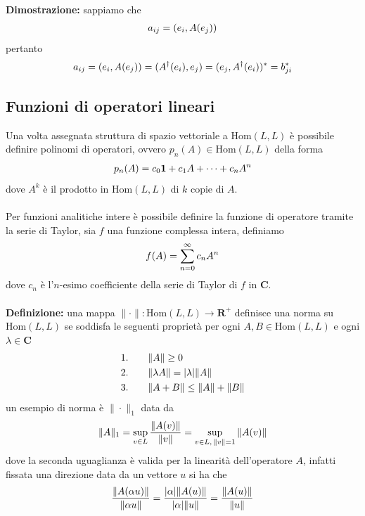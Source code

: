 \documentclass{article}
\begin{document}
\textbf{Dimostrazione:} sappiamo che
\begin{gather}
    a_{ij} = (e_i, A(e_j)) \notag
\end{gather}
pertanto
\begin{gather}
    a_{ij} = (e_i, A(e_j)) = (A^\dagger(e_i), e_j) = (e_j, A^\dagger(e_i))^* = b^*_{ji} \notag
\end{gather}

\newpage
\subsection{Funzioni di operatori lineari}
Una volta assegnata struttura di spazio vettoriale a $\mathrm{Hom}(L, L)$ è possibile definire polinomi di operatori, ovvero $p_n(A) \in \mathrm{Hom}(L, L)$ della forma
\begin{gather}
    p_n(A) = c_0\mathbf{1} + c_1A + \dots + c_nA^n \notag
\end{gather}
dove $A^k$ è il prodotto in $\mathrm{Hom}(L, L)$ di $k$ copie di $A$. \\ \\
Per funzioni analitiche intere è possibile definire la funzione di operatore tramite la serie di Taylor, sia $f$ una funzione complessa intera, definiamo
\begin{gather}
    f(A) = \sum_{n = 0}^\infty c_nA^n \notag
\end{gather}
dove $c_n$ è l'$n$-esimo coefficiente della serie di Taylor di $f$ in $\mathbf{C}$. \\ \\
\textbf{Definizione:} una mappa $\|\cdot\| : \mathrm{Hom}(L, L) \longrightarrow \mathbf{R}^+$ definisce una norma su $\mathrm{Hom}(L, L)$ se soddisfa le seguenti proprietà per ogni $A, B \in \mathrm{Hom}(L, L)$ e ogni $\lambda \in \mathbf{C}$
\begin{align}
    1. \qquad &\|A\| \geq 0 \notag \\
    2. \qquad &\|\lambda A\| = |\lambda|\|A\| \notag \\
    3. \qquad &\|A + B\| \leq \|A\| + \|B\| \notag
\end{align}
un esempio di norma è $\|\cdot\|_1$ data da
\begin{gather}
    \|A\|_1 = \sup_{v \in L}\frac{\|A(v)\|}{\|v\|} = \sup_{v \in L, \, \|v\| = 1}\|A(v)\| \notag
\end{gather}
dove la seconda uguaglianza è valida per la linearità dell'operatore $A$, infatti fissata una direzione data da un vettore $u$ si ha che
\begin{gather}
    \frac{\|A(\alpha u)\|}{\|\alpha u\|} = \frac{|\alpha|\|A(u)\|}{|\alpha|\|u\|} = \frac{\|A(u)\|}{\|u\|} \notag
\end{gather}
\end{document}
